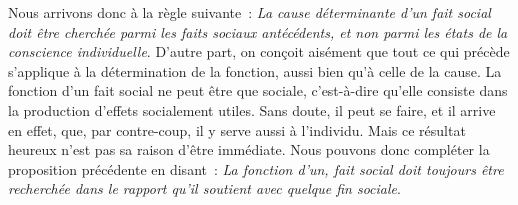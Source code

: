 \documentclass[french,twoside]{book} %
\begin{document}
Nous arrivons donc à la règle suivante : {\itshape La cause déterminante d’un fait social doit être cherchée parmi les faits sociaux antécédents, et non parmi les états de la conscience individuelle}. D’autre part, on conçoit aisément que tout ce qui précède s’applique à la détermination de la fonction, aussi bien qu’à celle de la cause. La fonction d’un fait social ne peut être que sociale, c’est-à-dire qu’elle consiste dans la production d’effets socialement utiles. Sans doute, il peut se faire, et il arrive en effet, que, par contre-coup, il y serve aussi à l’individu. Mais ce résultat heureux n’est pas sa raison d’être immédiate. Nous pouvons donc compléter la proposition précédente en disant : {\itshape La fonction d’un, fait social doit toujours être recherchée dans le rapport qu’il soutient avec quelque fin sociale}.\par
\end{document}
